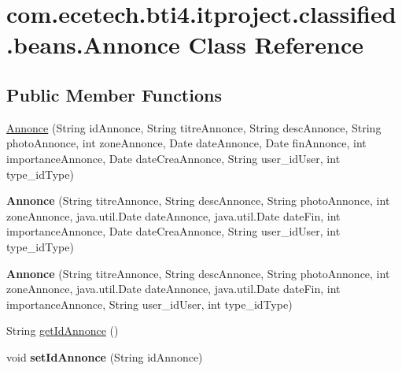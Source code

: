 \hypertarget{classcom_1_1ecetech_1_1bti4_1_1itproject_1_1classified_1_1beans_1_1_annonce}{}\section{com.\+ecetech.\+bti4.\+itproject.\+classified.\+beans.\+Annonce Class Reference}
\label{classcom_1_1ecetech_1_1bti4_1_1itproject_1_1classified_1_1beans_1_1_annonce}
\subsection*{Public Member Functions}
\begin{DoxyCompactItemize}
\item 
\hyperlink{classcom_1_1ecetech_1_1bti4_1_1itproject_1_1classified_1_1beans_1_1_annonce_aa1cd2c08d3b32086a20d786bafe463d2}{Annonce} (String id\+Annonce, String titre\+Annonce, String desc\+Annonce, String photo\+Annonce, int zone\+Annonce, Date date\+Annonce, Date fin\+Annonce, int importance\+Annonce, Date date\+Crea\+Annonce, String user\+\_\+id\+User, int type\+\_\+id\+Type)
\item 
{\bfseries Annonce} (String titre\+Annonce, String desc\+Annonce, String photo\+Annonce, int zone\+Annonce, java.\+util.\+Date date\+Annonce, java.\+util.\+Date date\+Fin, int importance\+Annonce, Date date\+Crea\+Annonce, String user\+\_\+id\+User, int type\+\_\+id\+Type)\hypertarget{classcom_1_1ecetech_1_1bti4_1_1itproject_1_1classified_1_1beans_1_1_annonce_a6193a98a9a8d6c796f767cbfa320772f}{}\label{classcom_1_1ecetech_1_1bti4_1_1itproject_1_1classified_1_1beans_1_1_annonce_a6193a98a9a8d6c796f767cbfa320772f}

\item 
{\bfseries Annonce} (String titre\+Annonce, String desc\+Annonce, String photo\+Annonce, int zone\+Annonce, java.\+util.\+Date date\+Annonce, java.\+util.\+Date date\+Fin, int importance\+Annonce, String user\+\_\+id\+User, int type\+\_\+id\+Type)\hypertarget{classcom_1_1ecetech_1_1bti4_1_1itproject_1_1classified_1_1beans_1_1_annonce_ab8cfd4e21b55330de2c707946cb1e2ee}{}\label{classcom_1_1ecetech_1_1bti4_1_1itproject_1_1classified_1_1beans_1_1_annonce_ab8cfd4e21b55330de2c707946cb1e2ee}

\item 
String \hyperlink{classcom_1_1ecetech_1_1bti4_1_1itproject_1_1classified_1_1beans_1_1_annonce_a8322c885bfb8ad443531750129c882c5}{get\+Id\+Annonce} ()
\item 
void {\bfseries set\+Id\+Annonce} (String id\+Annonce)\hypertarget{classcom_1_1ecetech_1_1bti4_1_1itproject_1_1classified_1_1beans_1_1_annonce_a5d034a439f1099ab366b9885c71b2bfb}{}\label{classcom_1_1ecetech_1_1bti4_1_1itproject_1_1classified_1_1beans_1_1_annonce_a5d034a439f1099ab366b9885c71b2bfb}


\end{DoxyCompactItemize}
